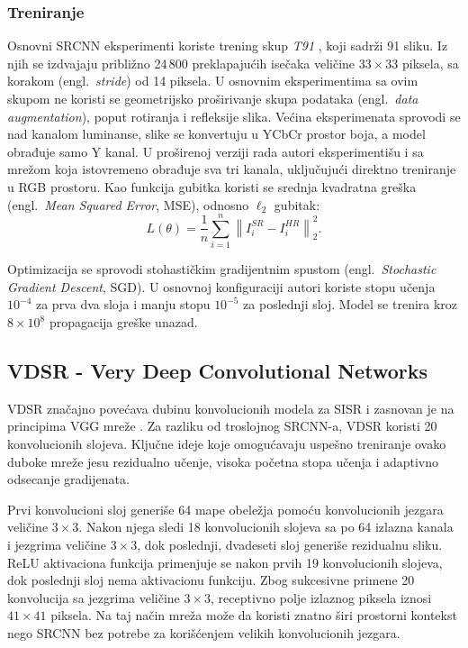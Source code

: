 \documentclass[12pt,a4paper]{article}
\begin{document}
\subsubsection{Treniranje}

Osnovni SRCNN eksperimenti koriste trening skup \textit{T91} \cite{yang2010}, koji sadrži 91 sliku. Iz njih se izdvajaju približno 24\,800 preklapajućih isečaka veličine $33 \times 33$ piksela, sa korakom (engl.\ \textit{stride}) od 14 piksela. U osnovnim eksperimentima sa ovim skupom ne koristi se geometrijsko proširivanje skupa podataka (engl.\ \textit{data augmentation}), poput rotiranja i refleksije slika. Većina eksperimenata sprovodi se nad kanalom luminanse, slike se konvertuju u YCbCr prostor boja, a model obrađuje samo Y kanal. U proširenoj verziji rada autori eksperimentišu i sa mrežom koja istovremeno obrađuje sva tri kanala, uključujući direktno treniranje u RGB prostoru. Kao funkcija gubitka koristi se srednja kvadratna greška (engl.\ \textit{Mean Squared Error}, MSE), odnosno $\ell_2$ gubitak:
\begin{equation}
	L(\theta)
	=
	\frac{1}{n}
	\sum_{i=1}^{n}
	\left\|
	I^{SR}_i-I^{HR}_i
	\right\|_2^2.
\end{equation}

Optimizacija se sprovodi stohastičkim gradijentnim spustom (engl.\ \textit{Stochastic Gradient Descent}, SGD). U osnovnoj konfiguraciji autori koriste stopu učenja $10^{-4}$ za prva dva sloja i manju stopu $10^{-5}$ za poslednji sloj. Model se trenira kroz $8\times10^8$ propagacija greške unazad.


\subsection{VDSR - Very Deep Convolutional Networks}

VDSR \cite{VDSR} značajno povećava dubinu konvolucionih modela za SISR i zasnovan je na principima VGG mreže \cite{VGG}. Za razliku od troslojnog SRCNN-a, VDSR koristi 20 konvolucionih slojeva. Ključne ideje koje omogućavaju uspešno treniranje ovako duboke mreže jesu rezidualno učenje, visoka početna stopa učenja i adaptivno odsecanje gradijenata.

Prvi konvolucioni sloj generiše 64 mape obeležja pomoću konvolucionih jezgara veličine $3\times3$. Nakon njega sledi 18 konvolucionih slojeva sa po 64 izlazna kanala i jezgrima veličine $3\times3$, dok poslednji, dvadeseti sloj generiše rezidualnu sliku. ReLU aktivaciona funkcija primenjuje se nakon prvih 19 konvolucionih slojeva, dok poslednji sloj nema aktivacionu funkciju. Zbog sukcesivne primene 20 konvolucija sa jezgrima veličine $3\times3$, receptivno polje izlaznog piksela iznosi $41\times41$ piksela. Na taj način mreža može da koristi znatno širi prostorni kontekst nego SRCNN bez potrebe za korišćenjem velikih konvolucionih jezgara.
\end{document}

